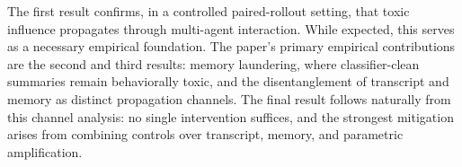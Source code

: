 The first result confirms, in a controlled paired-rollout setting, that toxic influence propagates through multi-agent interaction. While expected, this serves as a necessary empirical foundation. The paper's primary empirical contributions are the second and third results: memory laundering, where classifier-clean summaries remain behaviorally toxic, and the disentanglement of transcript and memory as distinct propagation channels. The final result follows naturally from this channel analysis: no single intervention suffices, and the strongest mitigation arises from combining controls over transcript, memory, and parametric amplification. 

